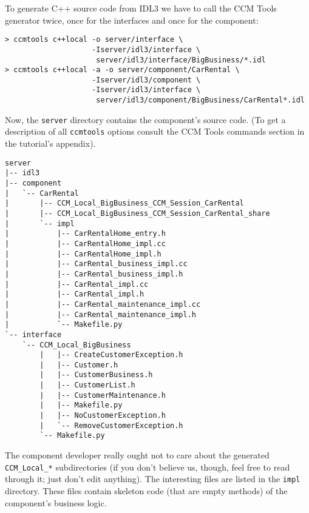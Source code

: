 To generate C++ source code from IDL3 we have to call the CCM Tools generator
twice, once for the interfaces and once for the component:
\begin{small}
\begin{verbatim}
> ccmtools c++local -o server/interface \
                    -Iserver/idl3/interface \
                     server/idl3/interface/BigBusiness/*.idl
> ccmtools c++local -a -o server/component/CarRental \
                    -Iserver/idl3/component \
                    -Iserver/idl3/interface \
                     server/idl3/component/BigBusiness/CarRental*.idl 
\end{verbatim}
\end{small}

Now, the {\tt server} directory contains the component's source code. 
(To get a description of all {\tt ccmtools} options consult the 
CCM Tools commands section in the tutorial's appendix).
\begin{small}
\begin{verbatim}
server
|-- idl3
|-- component
|   `-- CarRental
|       |-- CCM_Local_BigBusiness_CCM_Session_CarRental
|       |-- CCM_Local_BigBusiness_CCM_Session_CarRental_share
|       `-- impl
|           |-- CarRentalHome_entry.h
|           |-- CarRentalHome_impl.cc
|           |-- CarRentalHome_impl.h
|           |-- CarRental_business_impl.cc
|           |-- CarRental_business_impl.h
|           |-- CarRental_impl.cc
|           |-- CarRental_impl.h
|           |-- CarRental_maintenance_impl.cc
|           |-- CarRental_maintenance_impl.h
|           `-- Makefile.py
`-- interface
    `-- CCM_Local_BigBusiness
        |   |-- CreateCustomerException.h
        |   |-- Customer.h
        |   |-- CustomerBusiness.h
        |   |-- CustomerList.h
        |   |-- CustomerMaintenance.h
        |   |-- Makefile.py
        |   |-- NoCustomerException.h
        |   `-- RemoveCustomerException.h
        `-- Makefile.py
\end{verbatim}
\end{small}

The component developer really ought not to care about the generated 
{\tt CCM\_Local\_*} subdirectories (if you don't believe us, though, feel free 
to read through it; just don't edit anything). 
The interesting files are listed in the {\tt impl} directory. 
These files contain skeleton code (that are empty methods) of the component's 
business logic.

